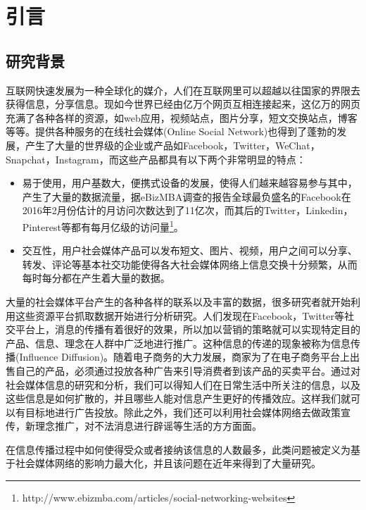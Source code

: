 

\chapter{引言}
\label{cha:firstChap01}
\section{研究背景}
互联网快速发展为一种全球化的媒介，人们在互联网里可以超越以往国家的界限去获得信息，分享信息。现如今世界已经由亿万个网页互相连接起来，这亿万的网页充满了各种各样的资源，如web应用，视频站点，图片分享，短文交换站点，博客等等。提供各种服务的在线社会媒体(Online Social Network)也得到了蓬勃的发展，产生了大量的世界级的企业或产品如Facebook，Twitter，WeChat，Snapchat，Instagram，而这些产品都具有以下两个非常明显的特点：
\begin{itemize}
\item 易于使用，用户基数大，便携式设备的发展，使得人们越来越容易参与其中，产生了大量的数据流量，据eBizMBA调查的报告全球最负盛名的Facebook在2016年2月份估计的月访问次数达到了11亿次，而其后的Twitter，Linkedin，Pinterest等都有每月亿级的访问量\footnote{http://www.ebizmba.com/articles/social-networking-websites}。
\item 交互性，用户社会媒体产品可以发布短文、图片、视频，用户之间可以分享、转发、评论等基本社交功能使得各大社会媒体网络上信息交换十分频繁，从而每时每分都在产生着大量的数据。
\end{itemize}


大量的社会媒体平台产生的各种各样的联系以及丰富的数据，很多研究者就开始利用这些资源平台抓取数据开始进行分析研究。人们发现在Facebook，Twitter等社交平台上，消息的传播有着很好的效果，所以加以营销的策略就可以实现特定目的产品、信息、理念在人群中广泛地进行推广\cite{he2012influence}。这种信息的传递的现象被称为信息传播(Influence Diffusion)。随着电子商务的大力发展，商家为了在电子商务平台上出售自己的产品，必须通过投放各种广告来引导消费者到该产品的买卖平台。通过对社会媒体信息的研究和分析，我们可以得知人们在日常生活中所关注的信息，以及这些信息是如何扩散的，并且哪些人能对信息产生更好的传播效应。这样我们就可以有目标地进行广告投放。除此之外，我们还可以利用社会媒体网络去做政策宣传，新理念推广，对不法消息进行辟谣等生活的方方面面。


在信息传播过程中如何使得受众或者接纳该信息的人数最多，此类问题被定义为基于社会媒体网络的影响力最大化，并且该问题在近年来得到了大量研究\cite{he2012influence}\cite{kempe2003maximizing}\cite{chen2011influence}\cite{chen2010scalable}。


